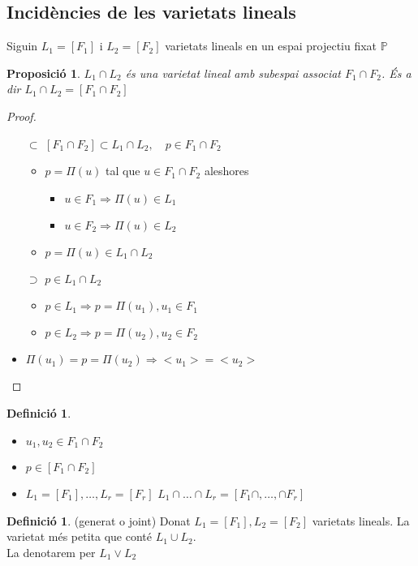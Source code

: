 \documentclass{article}
\newtheorem{proposition}[theorem]{Proposició}
\theoremstyle{definition}
\newtheorem{definition}[theorem]{Definició}
\newcommand{\PP}{\mathbb{P}}
\begin{document}
\subsection{Incidències de les varietats lineals}
Siguin $L_1 = [F_1]$ i $L_2 = [F_2]$ varietats lineals en un espai projectiu fixat $\PP$
\begin{proposition}
$L_1 \cap L_2$ és una varietat lineal amb subespai associat $F_1 \cap F_2$. És a dir $L_1 \cap L_2 = [F_1 \cap F_2]$
\end{proposition}
\begin{proof}
\begin{itemize}
\item[$\subset$] $[F_1 \cap F_2] \subset L_1 \cap L_2, \quad p \in F_1 \cap F_2$
	\begin{itemize}
	\item $p = \Pi(u)$ tal que $u \in F_1 \cap F_2$ aleshores
		\begin{itemize}
		\item $u \in F_1 \Rightarrow \Pi(u) \in L_1$
		\item $u \in F_2 \Rightarrow \Pi(u) \in L_2$
		\end{itemize}
	\item $p = \Pi(u) \in L_1 \cap L_2$
	\end{itemize}
\item[$\supset$] $p \in L_1 \cap L_2$
	\begin{itemize}
	\item $p \in L_1 \Rightarrow p = \Pi(u_1), u_1 \in F_1$
	\item $p \in L_2 \Rightarrow p = \Pi(u_2), u_2 \in F_2$
	\end{itemize}
\item $\Pi(u_1) = p = \Pi(u_2) \Rightarrow <u_1> = <u_2>$
\end{itemize}
\end{proof}

\begin{definition}
\begin{itemize}
\item $u_1, u_2 \in F_1 \cap F_2$
\item $p \in [F_1 \cap F_2]$
\item $L_1 = [F_1], \ldots, L_r = [F_r]$
\subitem $L_1 \cap \ldots \cap L_r = [F_1 \cap, \ldots, \cap F_r]$
\end{itemize}
\end{definition}

\begin{definition}(generat o joint)
Donat $L_1 = [F_1], L_2 = [F_2]$ varietats lineals. La varietat més petita que conté $L_1 \cup L_2$.\\
La denotarem per $L_1 \vee L_2$
\end{definition}
\end{document}
